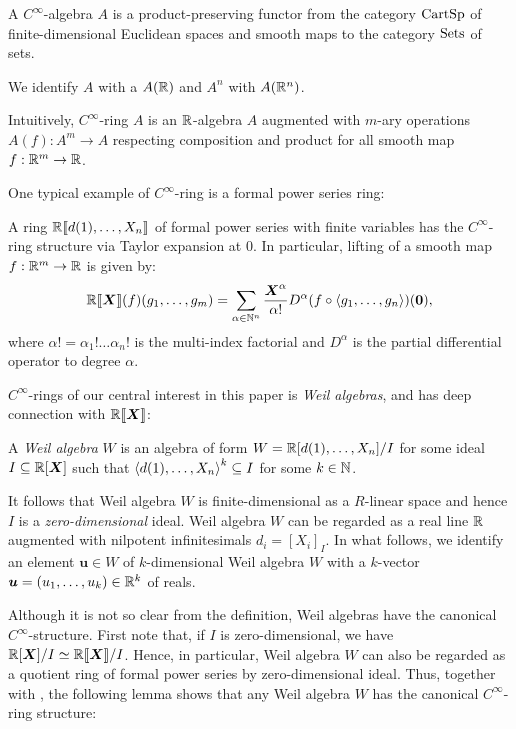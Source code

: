 \documentclass[%
  sigconf,authorversion,screen]{acmart}
\begin{document}
\begin{definition}
  A \emph{$C^\infty$}-algebra $A$ is a product-preserving functor from the category $\mathord{\mathrm{CartSp}}$ of finite-dimensional Euclidean spaces and smooth maps to the category $\mathord{\mathrm{Sets}}$ of sets.

  We identify $A$ with a $A(\mathbb{R})$ and $A^n$ with $A(\mathbb{R}^n)$.
\end{definition}

Intuitively, $C^\infty$-ring $A$ is an $\mathbb{R}$-algebra $A$ augmented with $m$-ary operations $A(f): A^m \to A$ respecting composition and product for all smooth map $f: \mathbb{R}^m \to \mathbb{R}$.

One typical example of $C^\infty$-ring is a formal power series ring:

\begin{theorem}[Lawvere]\label{thm:series-is-smooth}
  A ring $\mathbb{R}\llbracket d(1), \dots, X_n\rrbracket$ of formal power series with finite variables has the $C^\infty$-ring structure via Taylor expansion at $0$.
  In particular, lifting of a smooth map $f: \mathbb{R}^m \to \mathbb{R}$ is given by:
  \[
    \mathord{\mathbb{R}\llbracket\boldsymbol{X}\rrbracket}(f)(g_1, \dots, g_m) = \sum_{\alpha \in \mathbb{N}^n} \frac{\boldsymbol{X}^\alpha}{\alpha!} D^\alpha(f \circ \braket{g_1, \dots, g_n})(\boldsymbol{0}),
  \]
  where $\alpha! = \alpha_1 ! \dots \alpha_n !$ is the multi-index factorial and $D^\alpha$ is the partial differential operator to degree $\alpha$.
\end{theorem}

$C^\infty$-rings of our central interest in this paper is \emph{Weil algebras}, and has deep connection with $\mathord{\mathbb{R}\llbracket\boldsymbol{X}\rrbracket}$:

\begin{definition}
  A \emph{Weil algebra} $W$ is an algebra of form $W = \mathbb{R}[d(1), \dots, X_n]/I$ for some ideal $I \subseteq \mathbb{R}[\boldsymbol{X}]$ such that $\braket{d(1), \dots, X_n}^k \subseteq I$ for some $k \in \mathbb{N}$.
\end{definition}
It follows that Weil algebra $W$ is finite-dimensional as a $R$-linear space and hence $I$ is a \emph{zero-dimensional} ideal.
Weil algebra $W$ can be regarded as a real line $\mathbb{R}$ augmented with nilpotent infinitesimals $d_i = {[X_i]}_I$.
In what follows, we identify an element $\boldsymbol{u} \in W$ of $k$-dimensional Weil algebra $W$ with a $k$-vector $\boldsymbol{u} = (u_1, \dots, u_k) \in \mathbb{R}^k$ of reals.

Although it is not so clear from the definition, Weil algebras have the canonical $C^\infty$-structure.
First note that, if $I$ is zero-dimensional, we have $\mathbb{R}[\boldsymbol{X}]/I \simeq \mathbb{R}\llbracket \boldsymbol{X} \rrbracket /I$.
Hence, in particular, Weil algebra $W$ can also be regarded as a quotient ring of formal power series by zero-dimensional ideal.
Thus, together with , the following lemma shows that any Weil algebra $W$ has the canonical $C^\infty$-ring structure:
\end{document}
